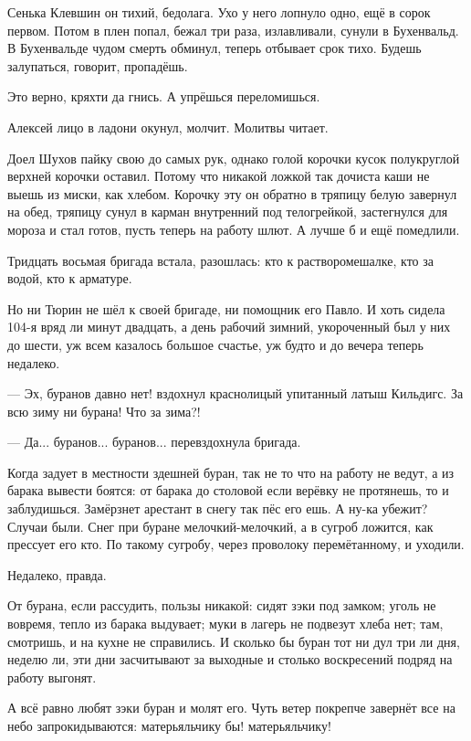 Сенька Клевшин \dash он тихий, бедолага. Ухо у него лопнуло одно, ещё в сорок первом. Потом в плен
попал, бежал три раза, излавливали, сунули в Бухенвальд. В Бухенвальде чудом смерть обминул,
теперь отбывает срок тихо. Будешь залупаться, говорит, пропадёшь.

Это верно, кряхти да гнись. А упрёшься \dash переломишься.

Алексей лицо в ладони окунул, молчит. Молитвы читает.

Доел Шухов пайку свою до самых рук, однако голой корочки кусок \dash полукруглой верхней
корочки \dash оставил. Потому что никакой ложкой так дочиста каши не выешь из миски, как хлебом.
Корочку эту он обратно в тряпицу белую завернул на обед, тряпицу сунул в карман внутренний
под телогрейкой, застегнулся для мороза и стал готов, пусть теперь на работу шлют. А лучше б и
ещё помедлили.

Тридцать восьмая бригада встала, разошлась: кто к растворомешалке, кто за водой, кто к
арматуре.

Но ни Тюрин не шёл к своей бригаде, ни помощник его Павло. И хоть сидела 104-я вряд ли минут
двадцать, а день рабочий \dash зимний, укороченный \dash был у них до шести, уж всем казалось большое
счастье, уж будто и до вечера теперь недалеко.

--- Эх, буранов давно нет! \dash вздохнул краснолицый упитанный латыш Кильдигс. \Dash За всю зиму \dash ни
бурана! Что за зима?!

--- Да... буранов... буранов... \dash перевздохнула бригада.

Когда задует в местности здешней буран, так не то что на работу не ведут, а из барака вывести
боятся: от барака до столовой если верёвку не протянешь, то и заблудишься. Замёрзнет
арестант в снегу \dash так пёс его ешь. А ну-ка убежит? Случаи были. Снег при буране
мелочкий-мелочкий, а в сугроб ложится, как прессует его кто. По такому сугробу, через
проволоку перемётанному, и уходили.

Недалеко, правда.

От бурана, если рассудить, пользы никакой: сидят зэки под замком; уголь не вовремя, тепло из
барака выдувает; муки в лагерь не подвезут \dash хлеба нет; там, смотришь, и на кухне не
справились. И сколько бы буран тот ни дул \dash три ли дня, неделю ли, \dash эти дни засчитывают за
выходные и столько воскресений подряд на работу выгонят.

А всё равно любят зэки буран и молят его. Чуть ветер покрепче завернёт \dash все на небо
запрокидываются: матерьяльчику бы! матерьяльчику!

